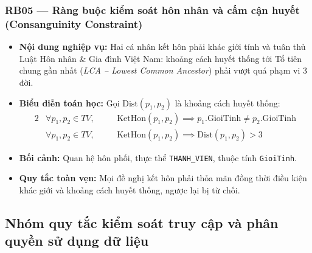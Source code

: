 \subsubsection{RB05 --- Ràng buộc kiểm soát hôn nhân và cấm cận huyết (Consanguinity Constraint)}
\begin{itemize}
    \item \textbf{Nội dung nghiệp vụ:} Hai cá nhân kết hôn phải khác giới tính và tuân thủ Luật Hôn nhân \& Gia đình Việt Nam: khoảng cách huyết thống tới Tổ tiên chung gần nhất (\textit{LCA -- Lowest Common Ancestor}) phải vượt quá phạm vi 3 đời.
    \item \textbf{Biểu diễn toán học:} Gọi $\text{Dist}(p_1, p_2)$ là khoảng cách huyết thống:
    \begin{alignat}{2}
        &\forall p_1, p_2 \in TV, \quad
        &&\text{KetHon}(p_1, p_2) \implies p_1.\text{GioiTinh} \ne p_2.\text{GioiTinh} \\[3pt]
        &\forall p_1, p_2 \in TV, \quad
        &&\text{KetHon}(p_1, p_2) \implies \text{Dist}(p_1, p_2) > 3
    \end{alignat}
    \item \textbf{Bối cảnh:} Quan hệ hôn phối, thực thể \texttt{THANH\_VIEN}, thuộc tính \texttt{GioiTinh}.
    \item \textbf{Quy tắc toàn vẹn:} Mọi đề nghị kết hôn phải thỏa mãn đồng thời điều kiện khác giới và khoảng cách huyết thống, ngược lại bị từ chối.
\end{itemize}

\subsection{Nhóm quy tắc kiểm soát truy cập và phân quyền sử dụng dữ liệu}

